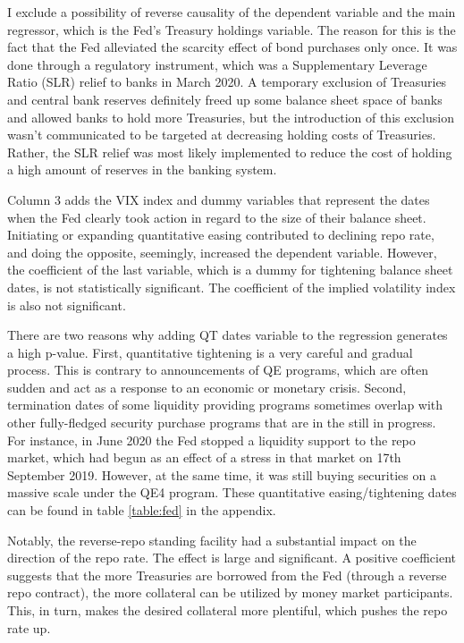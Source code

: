\documentclass[11pt,a4paper,english,oneside]{article}
\begin{document}
I exclude a possibility of reverse causality of the dependent variable and the main regressor, which is the Fed's Treasury holdings variable. The reason for this is the fact that the Fed alleviated the scarcity effect of bond purchases only once. It was done through a regulatory instrument, which was a Supplementary Leverage Ratio (SLR) relief to banks in March 2020. A temporary exclusion of Treasuries and central bank reserves definitely freed up some balance sheet space of banks and allowed banks to hold more Treasuries, but the introduction of this exclusion wasn't communicated to be targeted at decreasing holding costs of Treasuries. Rather, the SLR relief was most likely implemented to reduce the cost of holding a high amount of reserves in the banking system.


Column 3 adds the VIX index and dummy variables that represent the dates when the Fed clearly took action in regard to the size of their balance sheet. Initiating or expanding quantitative easing contributed to declining repo rate, and doing the opposite, seemingly, increased the dependent variable. However, the coefficient of the last variable, which is a dummy for tightening balance sheet dates, is not statistically significant. The coefficient of the implied volatility index is also not significant.

There are two reasons why adding QT dates variable to the regression generates a high p-value. First, quantitative tightening is a very careful and gradual process. This is contrary to announcements of QE programs, which are often sudden and act as a response to an economic or monetary crisis. Second, termination dates of some liquidity providing programs sometimes overlap with other fully-fledged security purchase programs that are in the still in progress. For instance, in June 2020 the Fed stopped a liquidity support to the repo market, which had begun as an effect of a stress in that market on 17th September 2019. However, at the same time, it was still buying securities on a massive scale under the QE4 program. These quantitative easing/tightening dates can be found in table \ref{table:fed} in the appendix.

Notably, the reverse-repo standing facility had a substantial impact on the direction of the repo rate. The effect is large and significant. A positive coefficient suggests that the more Treasuries are borrowed from the Fed (through a reverse repo contract), the more collateral can be utilized by money market participants. This, in turn, makes the desired collateral more plentiful, which pushes the repo rate up.
\end{document}
